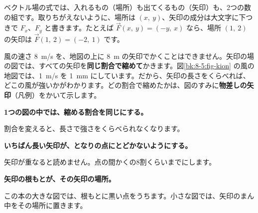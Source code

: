 \noindent ベクトル場の式では、入れるもの（場所）も出てくるもの（矢印）も、2つの数の組です。取りちがえないように、場所は $(x,\ y)$、矢印の成分は大文字に下つきで $F_x$、$F_y$ と書きます。たとえば $\vec F(x,\ y)=(-y,\ x)$ なら、場所 $(1,\ 2)$ の矢印は $\vec F(1,\ 2)=(-2,\ 1)$ です。


\leavevmode\label{bk:8-5:chijimi}風の速さ \qty{8}{m/s} を、地図の上に \qty{8}{m} の矢印でかくことはできません。矢印の場の図では、すべての矢印を\textbf{同じ割合で縮めて}かきます。図\ref{bk:8-5:fig-kion} の風の地図では、\qty{1}{m/s} を \qty{1}{mm} にしています。だから、矢印の長さをくらべれば、どこの風が強いかがわかります。どの割合で縮めたかは、図のすみに\textbf{物差しの矢印}（凡例）をかいて示します。
\begin{enumerate}[label={\bkcircled[\bkTT]{\arabic*}}, leftmargin=2.4\zw, itemsep=2pt, topsep=2pt]
\item \textbf{1つの図の中では、縮める割合を同じにする。}\par\nobreak\noindent 割合を変えると、長さで強さをくらべられなくなります。
\item \textbf{いちばん長い矢印が、となりの点にとどかないようにする。}\par\nobreak\noindent 矢印が重なると読めません。点の間かくの8割くらいまでにします。
\item \textbf{矢印の根もとが、その矢印の場所。}\par\nobreak\noindent この本の大きな図では、根もとに黒い点をうちます。小さな図では、矢印のまん中をその場所に置きます。
\end{enumerate}



